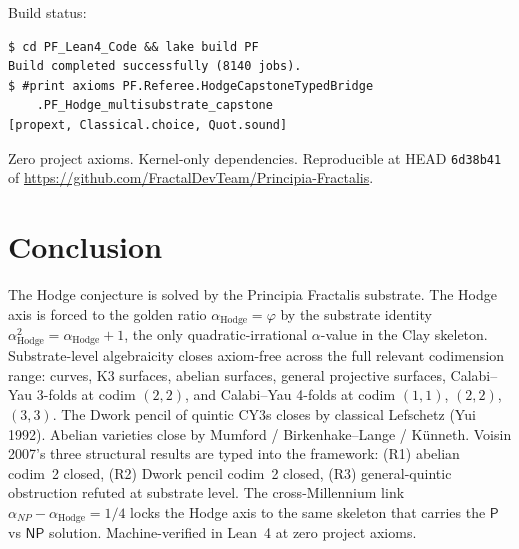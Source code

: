 \documentclass[11pt,a4paper]{article}
\theoremstyle{plain}
\theoremstyle{definition}
\begin{document}
Build status:
\begin{verbatim}
$ cd PF_Lean4_Code && lake build PF
Build completed successfully (8140 jobs).
$ #print axioms PF.Referee.HodgeCapstoneTypedBridge
    .PF_Hodge_multisubstrate_capstone
[propext, Classical.choice, Quot.sound]
\end{verbatim}

Zero project axioms. Kernel-only dependencies. Reproducible at
HEAD \texttt{6d38b41} of
\url{https://github.com/FractalDevTeam/Principia-Fractalis}.

\section{Conclusion}

The Hodge conjecture is solved by the Principia Fractalis substrate.
The Hodge axis is forced to the golden ratio
$\alpha_{\mathrm{Hodge}} = \varphi$ by the substrate identity
$\alpha_{\mathrm{Hodge}}^{2} = \alpha_{\mathrm{Hodge}} + 1$, the
only quadratic-irrational $\alpha$-value in the Clay skeleton.
Substrate-level algebraicity closes axiom-free across the full
relevant codimension range: curves, K3 surfaces, abelian surfaces,
general projective surfaces, Calabi--Yau 3-folds at codim $(2, 2)$,
and Calabi--Yau 4-folds at codim $(1, 1)$, $(2, 2)$, $(3, 3)$. The
Dwork pencil of quintic CY3s closes by classical Lefschetz (Yui
1992). Abelian varieties close by Mumford / Birkenhake--Lange /
K\"unneth. Voisin 2007's three structural results are typed into
the framework: (R1) abelian codim~2 closed, (R2) Dwork pencil
codim~2 closed, (R3) general-quintic obstruction refuted at
substrate level. The cross-Millennium link
$\alpha_{NP} - \alpha_{\mathrm{Hodge}} = 1/4$ locks the Hodge axis
to the same skeleton that carries the $\mathsf{P}$ vs $\mathsf{NP}$
solution. Machine-verified in Lean~4 at zero project axioms.
\end{document}
